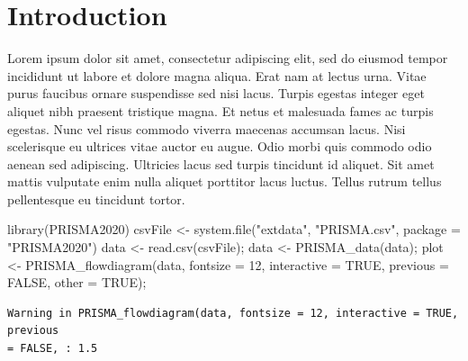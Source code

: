 \documentclass[
  BCOR=10mm, %
  DIV=12, %
  twoside, %
  headsepline, %
  listof=totoc, %
  bibliography=totoc, %
  index=totoc, %
  abstract=true, %
  numbers=noenddot, %
]{cs-thesis}
\newenvironment{Shaded}{\begin{snugshade}}{\end{snugshade}}
\newcommand{\AttributeTok}[1]{\textcolor[rgb]{0.40,0.45,0.13}{#1}}
\newcommand{\ConstantTok}[1]{\textcolor[rgb]{0.56,0.35,0.01}{#1}}
\newcommand{\DecValTok}[1]{\textcolor[rgb]{0.68,0.00,0.00}{#1}}
\newcommand{\FunctionTok}[1]{\textcolor[rgb]{0.28,0.35,0.67}{#1}}
\newcommand{\NormalTok}[1]{\textcolor[rgb]{0.00,0.23,0.31}{#1}}
\newcommand{\OtherTok}[1]{\textcolor[rgb]{0.00,0.23,0.31}{#1}}
\newcommand{\StringTok}[1]{\textcolor[rgb]{0.13,0.47,0.30}{#1}}
\begin{document}
    
    \ofoot[\pagemark]{\pagemark} %
    \nocite{*} %
    \cleardoublepage
    \pagestyle{chapterstyle}
    

    \chapter{Introduction}\label{cha:introduction}

    Lorem ipsum dolor sit amet, consectetur adipiscing elit, sed do
    eiusmod tempor incididunt ut labore et dolore magna aliqua. Erat nam
    at lectus urna. Vitae purus faucibus ornare suspendisse sed nisi
    lacus. Turpis egestas integer eget aliquet nibh praesent tristique
    magna. Et netus et malesuada fames ac turpis egestas. Nunc vel risus
    commodo viverra maecenas accumsan lacus. Nisi scelerisque eu
    ultrices vitae auctor eu augue. Odio morbi quis commodo odio aenean
    sed adipiscing. Ultricies lacus sed turpis tincidunt id aliquet. Sit
    amet mattis vulputate enim nulla aliquet porttitor lacus luctus.
    Tellus rutrum tellus pellentesque eu tincidunt tortor.

\begin{Shaded}
\begin{Highlighting}[]
\FunctionTok{library}\NormalTok{(PRISMA2020)}
\NormalTok{csvFile }\OtherTok{\textless{}{-}} \FunctionTok{system.file}\NormalTok{(}\StringTok{"extdata"}\NormalTok{, }\StringTok{"PRISMA.csv"}\NormalTok{, }\AttributeTok{package =} \StringTok{"PRISMA2020"}\NormalTok{)}
\NormalTok{data }\OtherTok{\textless{}{-}} \FunctionTok{read.csv}\NormalTok{(csvFile);}
\NormalTok{data }\OtherTok{\textless{}{-}} \FunctionTok{PRISMA\_data}\NormalTok{(data);}
\NormalTok{plot }\OtherTok{\textless{}{-}} \FunctionTok{PRISMA\_flowdiagram}\NormalTok{(data,}
                \AttributeTok{fontsize =} \DecValTok{12}\NormalTok{,}
                \AttributeTok{interactive =} \ConstantTok{TRUE}\NormalTok{,}
                \AttributeTok{previous =} \ConstantTok{FALSE}\NormalTok{,}
                \AttributeTok{other =} \ConstantTok{TRUE}\NormalTok{);}
\end{Highlighting}
\end{Shaded}

\begin{verbatim}
Warning in PRISMA_flowdiagram(data, fontsize = 12, interactive = TRUE, previous
= FALSE, : 1.5
\end{verbatim}
\end{document}
